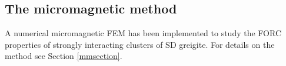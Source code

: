 \subsection{The micromagnetic method}
A numerical micromagnetic FEM \citep{OConbhui2017} has been implemented to study the FORC properties of strongly interacting clusters of SD greigite. For details on the method see Section \ref{mmsection}.\par

